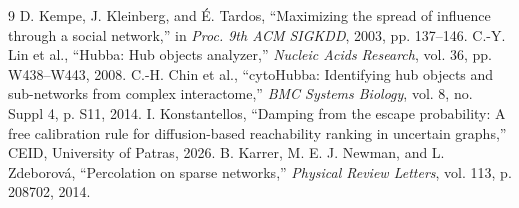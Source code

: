 \documentclass[11pt, a4paper]{article}
\begin{document}
\begin{thebibliography}{9}
 D. Kempe, J. Kleinberg, and \'{E}. Tardos, ``Maximizing the spread of influence through a social network,'' in \textit{Proc. 9th ACM SIGKDD}, 2003, pp. 137--146.
 C.-Y. Lin et al., ``Hubba: Hub objects analyzer,'' \textit{Nucleic Acids Research}, vol. 36, pp. W438--W443, 2008.
 C.-H. Chin et al., ``cytoHubba: Identifying hub objects and sub-networks from complex interactome,'' \textit{BMC Systems Biology}, vol. 8, no. Suppl 4, p. S11, 2014.
 I. Konstantellos, ``Damping from the escape probability: A free calibration rule for diffusion-based reachability ranking in uncertain graphs,'' CEID, University of Patras, 2026.
 B. Karrer, M. E. J. Newman, and L. Zdeborov\'{a}, ``Percolation on sparse networks,'' \textit{Physical Review Letters}, vol. 113, p. 208702, 2014.
\end{thebibliography}
\end{document}
